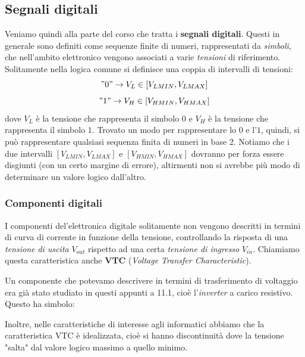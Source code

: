 \documentclass[a4paper,11pt]{article}
\begin{document}
\subsection{Segnali digitali}
Veniamo quindi alla parte del corso che tratta i \textbf{segnali digitali}. Questi in generale sono definiti come sequenze finite di numeri, rappresentati da \textit{simboli}, che nell'ambito elettronico vengono associati a varie \textit{tensioni} di riferimento. Solitamente nella logica comune si definisce una coppia di intervalli di tensioni:
$$
"0" \rightarrow V_L \in [ V_{LMIN}, V_{LMAX} ]
$$
$$
"1" \rightarrow V_H \in [ V_{HMIN}, V_{HMAX} ]
$$
dove $V_L$ è la tensione che rappresenta il simbolo $0$ e $V_H$ è la tensione che rappresenta il simbolo $1$. Trovato un modo per rappresentare lo $0$ e l'$1$, quindi, si può rappresentare qualsiasi sequenza finita di numeri in base 2. Notiamo che i due intervalli $[ V_{LMIN}, V_{LMAX} ]$ e $[ V_{HMIN}, V_{HMAX} ]$ dovranno per forza essere disgiunti (con un certo margine di errore), altirmenti non si avrebbe più modo di determinare un valore logico dall'altro.

\subsubsection{Componenti digitali}
I componenti del'elettronica digitale solitamente non vengono descritti in termini di curva di corrente in funzione della tensione, controllando la risposta di una \textit{tensione di uscita} $V_{out}$ rispetto ad una certa \textit{tensione di ingresso} $V_{in}$. Chiamiamo questa caratteristica anche \textbf{VTC} (\textit{Voltage Transfer Characteristic}). 

Un componente che potevamo descrivere in termini di trasferimento di voltaggio era già stato studiato in questi appunti a 11.1, cioè l'\textit{inverter} a carico resistivo. Questo ha simbolo:
\begin{center}
\end{center}

\par\smallskip

Inoltre, nelle caratteristiche di interesse agli informatici abbiamo che la caratteristica VTC è idealizzata, cioè si hanno discontinuità dove la tensione "salta" dal valore logico massimo a quello minimo.
\end{document}
